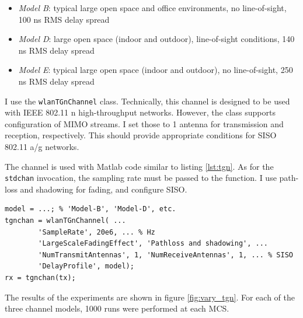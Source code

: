 \begin{itemize}
	\item \textit{Model B}: typical large open space and office environments, no line-of-sight, 100 ns \gls{RMS} delay spread
	\item \textit{Model D}: large open space (indoor and outdoor), line-of-sight conditions, 140 ns \gls{RMS} delay spread
	\item \textit{Model E}: typical large open space (indoor and outdoor), no line-of-sight, 250 ns \gls{RMS} delay spread
\end{itemize}

I use the \texttt{wlanTGnChannel} class. Technically, this channel is designed to be used with IEEE 802.11 n high-throughput networks. However, the class supports configuration of \gls{MIMO} streams. I set those to 1 antenna for transmission and reception, respectively. This should provide appropriate conditions for \gls{SISO} 802.11 a/g networks.

The channel is used with Matlab code similar to listing \ref{lst:tgn}. As for the \texttt{stdchan} invocation, the sampling rate must be passed to the function. I use path-loss and shadowing for fading, and configure \gls{SISO}.

\begin{lstlisting}[captionpos=b,caption={Matlab wlanTGnChannel Simulation},label=lst:tgn]
model = ...; % 'Model-B', 'Model-D', etc.
tgnchan = wlanTGnChannel( ...
        'SampleRate', 20e6, ... % Hz
        'LargeScaleFadingEffect', 'Pathloss and shadowing', ...
        'NumTransmitAntennas', 1, 'NumReceiveAntennas', 1, ... % SISO
        'DelayProfile', model);
rx = tgnchan(tx);
\end{lstlisting}

The results of the experiments are shown in figure \ref{fig:vary_tgn}. For each of the three channel models, 1000 runs were performed at each \gls{MCS}.

